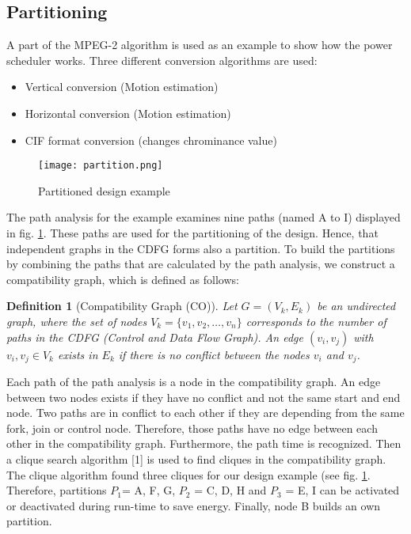 \documentclass[conference]{IEEEtran}
\newtheorem{definition}{Definition}
\begin{document}
\subsection{Partitioning}
\label{subsec: partitioning}
A part of the MPEG-2 algorithm is used as an example to show how the power scheduler works. Three different conversion algorithms are used:
\begin{itemize}
    \item Vertical conversion (Motion estimation)
    \item Horizontal conversion (Motion estimation)
    \item CIF format conversion (changes chrominance value)
\end{itemize}

\begin{figure}[h!]
    \centering
    \texttt{[image: partition.png]}
    \caption{Partitioned design example \cite{10.1007/978-0-387-39362-9_24}}
    \label{fig:partition}
\end{figure}

The path analysis for the example examines nine paths (named A to I) displayed in fig. \ref{fig:partition}. These paths are used for the partitioning of the design. Hence, that independent graphs in the CDFG forms also a partition. To build the partitions by combining the paths that are calculated by the path analysis, we construct a compatibility graph, which is defined as follows:

\begin{definition}[Compatibility Graph (CO)]
\label{def:compatibility}
Let $G = (V_k, E_k)$ be an undirected graph, where the set of nodes $V_k = \{v_1, v_2, \ldots, v_n\}$ corresponds to the number of paths in the CDFG (Control and Data Flow Graph). An edge $(v_i, v_j)$ with $v_i, v_j \in V_k$ exists in $E_k$ if there is no conflict between the nodes $v_i$ and $v_j$.
\end{definition}

Each path of the path analysis is a node in the compatibility graph. An edge between two nodes exists if they have no conflict and not the same start and end node. Two paths are in conflict to each other if they are depending from the same fork, join or control node. Therefore, those paths have no edge between each other in the compatibility graph. Furthermore, the path time is recognized. Then a clique search algorithm [1] is used to find cliques in the compatibility graph. The clique algorithm found three cliques for our design example (see fig. \ref{fig:partition}. Therefore, partitions  $P_1$= {A, F, G}, $P_2$ = {C, D, H} and $P_3$ = {E, I} can be activated or deactivated during run-time to save energy. Finally, node B builds an own partition.
\end{document}
